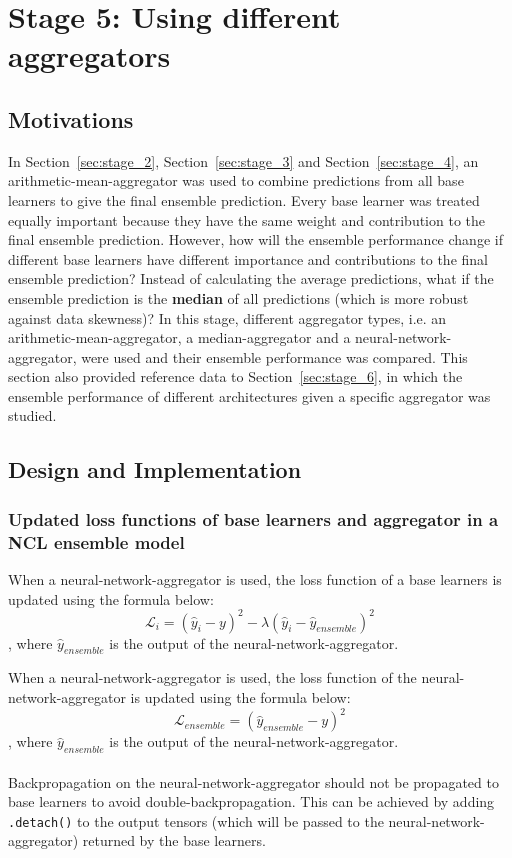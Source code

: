 \documentclass{article}
\begin{document}
\section{Stage 5: Using different aggregators}
\label{sec:stage_5}


\subsection{Motivations}
In Section~\ref{sec:stage_2}, Section~\ref{sec:stage_3} and Section~\ref{sec:stage_4}, an arithmetic-mean-aggregator was used to combine predictions from all base learners to give the final ensemble prediction. Every base learner was treated equally important because they have the same weight and contribution to the final ensemble prediction. However, how will the ensemble performance change if different base learners have different importance and contributions to the final ensemble prediction? Instead of calculating the average predictions, what if the ensemble prediction is the \textbf{median} of all predictions (which is more robust against data skewness)? In this stage, different aggregator types, i.e. an arithmetic-mean-aggregator, a median-aggregator and a neural-network-aggregator, were used and their ensemble performance was compared. This section also provided reference data to Section~\ref{sec:stage_6}, in which the ensemble performance of different architectures given a specific aggregator was studied. 


\subsection{Design and Implementation}


\subsubsection{Updated loss functions of base learners and aggregator in a NCL ensemble model}
When a neural-network-aggregator is used, the loss function of a base learners is updated using the formula below: 
\begin{equation}
    \label{equation:recursive_nn_loss_function_base_learner}
    \mathcal{L}_i = (\hat{y}_i - y)^2 - \lambda (\hat{y}_i - \hat{y}_{ensemble})^2
\end{equation}
, where $\hat{y}_{ensemble}$ is the output of the neural-network-aggregator. 


When a neural-network-aggregator is used, the loss function of the neural-network-aggregator is updated using the formula below: 
\begin{equation}
    \label{equation:recursive_nn_loss_function_aggregator}
    \mathcal{L}_{ensemble} = (\hat{y}_{ensemble} - y)^2
\end{equation}
, where $\hat{y}_{ensemble}$ is the output of the neural-network-aggregator. 
\\
\\
Backpropagation on the neural-network-aggregator should not be propagated to base learners to avoid double-backpropagation. This can be achieved by adding \texttt{.detach()} to the output tensors (which will be passed to the neural-network-aggregator) returned by the base learners. 
\end{document}
